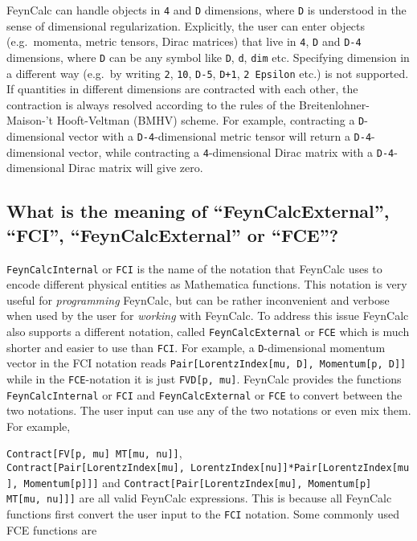 \documentclass[../FeynCalcManual.tex]{subfiles}
\begin{document}
FeynCalc can handle objects in \texttt{4} and \texttt{D} dimensions,
where \texttt{D} is understood in the sense of dimensional
regularization. Explicitly, the user can enter objects (e.g.~momenta,
metric tensors, Dirac matrices) that live in \texttt{4}, \texttt{D} and
\texttt{D-4} dimensions, where \texttt{D} can be any symbol like
\texttt{D}, \texttt{d}, \texttt{dim} etc. Specifying dimension in a
different way (e.g.~by writing \texttt{2}, \texttt{10}, \texttt{D-5},
\texttt{D+1}, \texttt{2 Epsilon} etc.) is not supported. If quantities
in different dimensions are contracted with each other, the contraction
is always resolved according to the rules of the Breitenlohner-Maison-'t
Hooft-Veltman (BMHV) scheme. For example, contracting a
\texttt{D}-dimensional vector with a \texttt{D-4}-dimensional metric
tensor will return a \texttt{D-4}-dimensional vector, while contracting
a \texttt{4}-dimensional Dirac matrix with a \texttt{D-4}-dimensional
Dirac matrix will give zero.

\hypertarget{what-is-the-meaning-of-feyncalcexternal-fci-feyncalcexternal-or-fce}{%
\subsection{What is the meaning of ``FeynCalcExternal'', ``FCI'',
``FeynCalcExternal'' or
``FCE''?}\label{what-is-the-meaning-of-feyncalcexternal-fci-feyncalcexternal-or-fce}}

\texttt{FeynCalcInternal} or \texttt{FCI} is the name of the notation
that FeynCalc uses to encode different physical entities as Mathematica
functions. This notation is very useful for \emph{programming} FeynCalc,
but can be rather inconvenient and verbose when used by the user for
\emph{working} with FeynCalc. To address this issue FeynCalc also
supports a different notation, called \texttt{FeynCalcExternal} or
\texttt{FCE} which is much shorter and easier to use than \texttt{FCI}.
For example, a \texttt{D}-dimensional momentum vector in the FCI
notation reads
\texttt{Pair[\allowbreak{}LorentzIndex[\allowbreak{}mu,\ \allowbreak{}D],\ \allowbreak{}Momentum[\allowbreak{}p,\ \allowbreak{}D]]}
while in the \texttt{FCE}-notation it is just
\texttt{FVD[\allowbreak{}p,\ \allowbreak{}mu]}. FeynCalc provides the
functions \texttt{FeynCalcInternal} or \texttt{FCI} and
\texttt{FeynCalcExternal} or \texttt{FCE} to convert between the two
notations. The user input can use any of the two notations or even mix
them. For example,

\texttt{Contract[\allowbreak{}FV[\allowbreak{}p,\ \allowbreak{}mu] MT[\allowbreak{}mu,\ \allowbreak{}nu]]},
\texttt{Contract[\allowbreak{}Pair[\allowbreak{}LorentzIndex[\allowbreak{}mu],\ \allowbreak{}LorentzIndex[\allowbreak{}nu]]*Pair[\allowbreak{}LorentzIndex[\allowbreak{}mu],\ \allowbreak{}Momentum[\allowbreak{}p]]]}
and
\texttt{Contract[\allowbreak{}Pair[\allowbreak{}LorentzIndex[\allowbreak{}mu],\ \allowbreak{}Momentum[\allowbreak{}p] MT[\allowbreak{}mu,\ \allowbreak{}nu]]]}
are all valid FeynCalc expressions. This is because all FeynCalc
functions first convert the user input to the \texttt{FCI} notation.
Some commonly used FCE functions are
\end{document}
